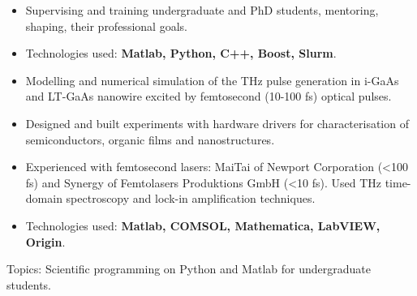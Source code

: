 \documentclass[10pt,a4paper,ragged2e,withhyper]{altacv}
\begin{document}
\begin{paracol}{2}
\begin{itemize}
    \item
    Supervising and training undergraduate and PhD students, mentoring, shaping,
    their professional goals.

    \item
    Technologies used: {\bf Matlab, Python, C++, Boost, Slurm}.

\end{itemize}

\divider


\begin{itemize}

    \item
    Modelling and numerical simulation of the THz pulse generation in i-GaAs
    and LT-GaAs nanowire excited by femtosecond (10-100 fs) optical pulses.

    \item
    Designed and built experiments with hardware drivers for
    characterisation of semiconductors, organic films and nanostructures.
    
    \item
    Experienced with femtosecond lasers: MaiTai of Newport Corporation (<100 fs)
    and Synergy of Femtolasers Produktions GmbH (<10 fs).
    Used THz time-domain spectroscopy and lock-in amplification techniques.

    \item
    Technologies used: {\bf Matlab, COMSOL, Mathematica, LabVIEW, Origin}.

\end{itemize}



Topics: Scientific programming on Python and Matlab for undergraduate students.





\divider


\end{paracol}
\end{document}
